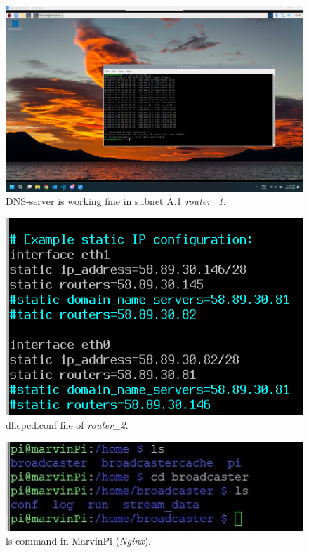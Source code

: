 \documentclass[a4paper,1pt]{article}
\begin{document}
\begin{figure}[H]
	\centering
	\includegraphics[width=\textwidth]{dns.png}
	\caption{DNS-server is working fine in subnet A.1 \textit{router\_1}.}
	\label{fig:dns}
\end{figure}

\begin{figure}[H]
	\centering
	\includegraphics[width=\textwidth]{config1.png}
	\caption{dhcpcd.conf file of \textit{router\_2}.}
	\label{fig:dhcpcd}
\end{figure}

\begin{figure}[H]
	\centering
	\includegraphics[width=\textwidth]{FoldersNGINX.jpg}
	\caption{ls command in MarvinPi (\textit{Nginx}).}
	\label{fig:marvin}
\end{figure}
\end{document}

